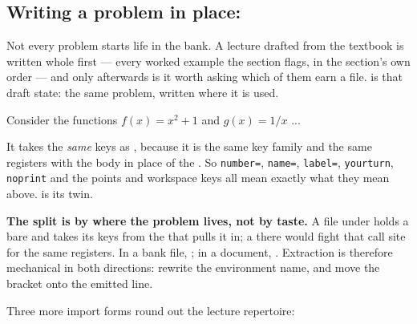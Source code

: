 \subsection{Writing a problem in place: }

Not every problem starts life in the bank. A lecture drafted from the textbook
is written whole first --- every worked example the section flags, in the
section's own order --- and only afterwards is it worth asking which of them
earn a file.  is that draft state: the same problem, written
where it is used.

\begin{manexsource}
\begin{notesproblem}[number={1.7}, name={composing two formulas}]
  Consider the functions $f(x) = x^2+1$ and $g(x) = 1/x$ ...
\end{notesproblem}
\end{manexsource}

It takes the \emph{same} keys as , because it is the same
key family and the same registers with the body in place of the .
So \texttt{number=}, \texttt{name=}, \texttt{label=}, \texttt{yourturn},
\texttt{noprint} and the points and workspace keys all mean exactly what they
mean above.  is its  twin.

\textbf{The split is by where the problem lives, not by taste.} A file under
 holds a bare  and takes its keys from the
 that pulls it in; a  there would fight
that call site for the same registers. In a bank file, ; in a
document, . Extraction is therefore mechanical in both
directions: rewrite the environment name, and move the bracket onto the
emitted  line.

Three more import forms round out the lecture repertoire:

